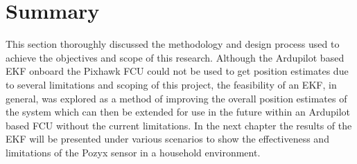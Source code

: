 \section{Summary}
This section thoroughly discussed the methodology and design process used to achieve the objectives and scope of this research.
Although the Ardupilot based EKF onboard the Pixhawk FCU could not be used to get position estimates due to several
limitations and scoping of this project, the feasibility of an EKF, in general, was explored as a method of improving the
overall position estimates of the system which can then be extended for use in the future within an Ardupilot based FCU without the current limitations.
In the next chapter the results of the EKF will be presented under various scenarios to show the effectiveness and limitations of the Pozyx sensor in a household environment.
